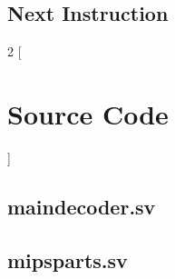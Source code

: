 \documentclass[titlepage,12pt,twoside,a4paper]{article}
\begin{document}
\subsection{Next Instruction}

\newpage
\appendix
\begin{multicols}{2}
[	
\section{Source Code}
\label{appendix:src}
]
\subsection{maindecoder.sv}


\subsection{mipsparts.sv}
\label{appendix:src:mipsparts}

\end{multicols}
\end{document}
